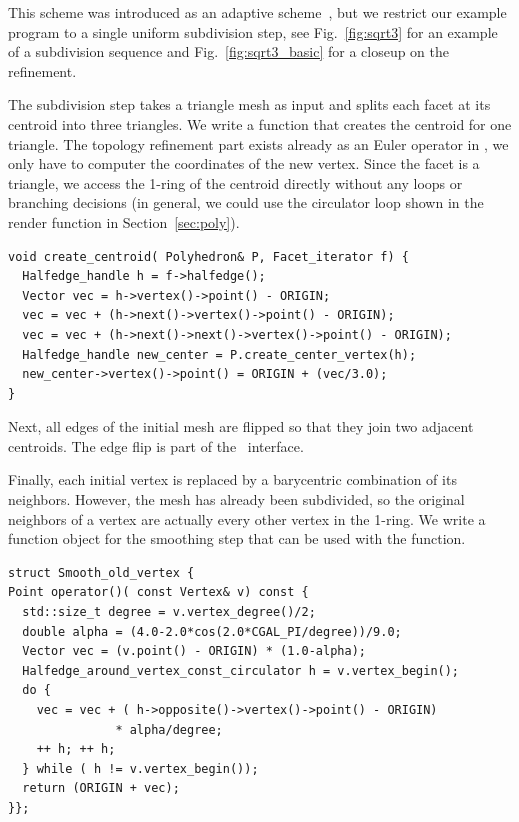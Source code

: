 \label{sec:sqrt3}

This scheme was introduced as an adaptive scheme~\cite{sqrt3}, but we
restrict our example program to a single uniform subdivision step, see
Fig.~\ref{fig:sqrt3} for an example of a subdivision sequence and
Fig.~\ref{fig:sqrt3_basic} for a closeup on the refinement.

The subdivision step takes a triangle mesh as input and splits each
facet at its centroid into three triangles.  We write a function that
creates the centroid for one triangle. The topology refinement part
exists already as an Euler operator in \cgalpoly, we only have to
computer the coordinates of the new vertex. Since the facet is a
triangle, we access the 1-ring of the centroid directly without any
loops or branching decisions (in general, we could use the circulator
loop shown in the render function in Section~\ref{sec:poly}).

\begin{lstlisting}
void create_centroid( Polyhedron& P, Facet_iterator f) {
  Halfedge_handle h = f->halfedge();
  Vector vec = h->vertex()->point() - ORIGIN;
  vec = vec + (h->next()->vertex()->point() - ORIGIN);
  vec = vec + (h->next()->next()->vertex()->point() - ORIGIN);
  Halfedge_handle new_center = P.create_center_vertex(h);
  new_center->vertex()->point() = ORIGIN + (vec/3.0);
}
\end{lstlisting}

Next, all edges of the initial mesh are flipped so that they join two
adjacent centroids. The edge flip is part of the \cgalpoly\ interface.

Finally, each initial vertex is replaced by a barycentric combination
of its neighbors. However, the mesh has already been subdivided, so
the original neighbors of a vertex are actually every other vertex in
the 1-ring. We write a function object for the smoothing step that
can be used with the  function.

\begin{lstlisting}
struct Smooth_old_vertex {
Point operator()( const Vertex& v) const {
  std::size_t degree = v.vertex_degree()/2;
  double alpha = (4.0-2.0*cos(2.0*CGAL_PI/degree))/9.0;
  Vector vec = (v.point() - ORIGIN) * (1.0-alpha);
  Halfedge_around_vertex_const_circulator h = v.vertex_begin();
  do {
    vec = vec + ( h->opposite()->vertex()->point() - ORIGIN) 
               * alpha/degree;
    ++ h; ++ h;
  } while ( h != v.vertex_begin());
  return (ORIGIN + vec);
}};
\end{lstlisting}

